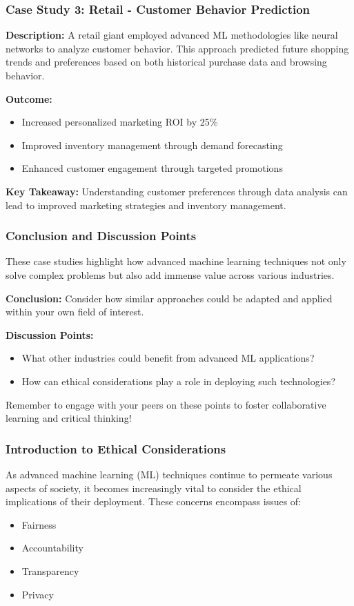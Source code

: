 \documentclass[aspectratio=169]{beamer}
\begin{document}
\begin{frame}[fragile]
    \frametitle{Case Study 3: Retail - Customer Behavior Prediction}
    
    \textbf{Description:}  
    A retail giant employed advanced ML methodologies like neural networks to analyze customer behavior. This approach predicted future shopping trends and preferences based on both historical purchase data and browsing behavior.
    
    \textbf{Outcome:}
    \begin{itemize}
        \item Increased personalized marketing ROI by 25\%
        \item Improved inventory management through demand forecasting
        \item Enhanced customer engagement through targeted promotions
    \end{itemize}
    
    \textbf{Key Takeaway:}  
    Understanding customer preferences through data analysis can lead to improved marketing strategies and inventory management.
\end{frame}

\begin{frame}[fragile]
    \frametitle{Conclusion and Discussion Points}
    These case studies highlight how advanced machine learning techniques not only solve complex problems but also add immense value across various industries. 

    \textbf{Conclusion:}  
    Consider how similar approaches could be adapted and applied within your own field of interest.
    
    \textbf{Discussion Points:}
    \begin{itemize}
        \item What other industries could benefit from advanced ML applications?
        \item How can ethical considerations play a role in deploying such technologies?
    \end{itemize}

    Remember to engage with your peers on these points to foster collaborative learning and critical thinking!
\end{frame}

\begin{frame}[fragile]
    \frametitle{Introduction to Ethical Considerations}
    As advanced machine learning (ML) techniques continue to permeate various aspects of society, it becomes increasingly vital to consider the ethical implications of their deployment. These concerns encompass issues of:
    \begin{itemize}
        \item Fairness
        \item Accountability
        \item Transparency
        \item Privacy
    \end{itemize}
\end{frame}
\end{document}
